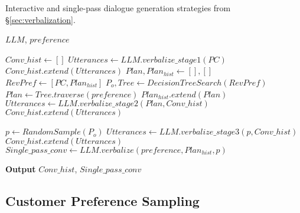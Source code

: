 \begin{algorithm}[t!]

\small
\caption{Interactive and single-pass dialogue generation strategies from \S\ref{sec:verbalization}.}
\label{alg:decision_tree_dialogue_generation}
\begin{algorithmic}
\Require $LLM$, $preference$ %


    \State $Conv\_hist \gets []$ 
    \State $Utterances \gets LLM.verbalize\_stage1(PC)$
    \State $Conv\_hist.extend(Utterances)$
{}
\State $Plan, Plan_{hist} \gets [], []$
\State $RevPref \gets [PC, Plan_{hist}]$
\State $P_o, Tree \gets DecisionTreeSearch(RevPref)$
\State $Plan \gets Tree.traverse(preference)$ 
\State $Plan_{hist}.extend(Plan)$
    \State $Utterances \gets LLM.verbalize\_stage2(Plan, Conv\_hist)$
    \State $Conv\_hist.extend(Utterances)$
\EndWhile

\State $p \gets RandomSample(P_o)$
\State $Utterances \gets LLM.verbalize\_stage3(p, Conv\_hist)$ 
\State $Conv\_hist.extend(Utterances)$
{}
\State $Single\_pass\_conv \gets LLM.verbalize(preference, Plan_{hist}, p)$ 

\State \textbf{Output}  $Conv\_hist$, $Single\_pass\_conv$
\end{algorithmic}
\end{algorithm}
\vspace{-0.5em}

\subsection{Customer Preference Sampling} \label{sec:preference_sampling}

